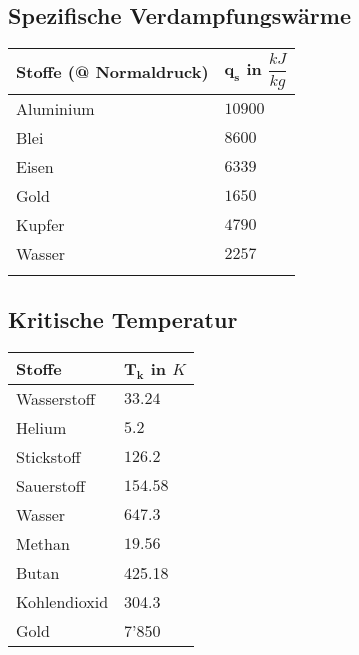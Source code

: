 	\subsection{Spezifische Verdampfungswärme}
		\begin{tabular}{| p{6cm} | p{5cm} |}
			\hline
			\textbf{Stoffe (@ Normaldruck)}	&	$\boldsymbol{q_s}$ in $\dfrac{kJ}{kg}$\\
			\hline
			Aluminium & $10900$\\
			Blei & $8600$\\
			Eisen & $6339$\\
			Gold & $1650$\\
			Kupfer & $4790$\\
			Wasser & $2257$\\
			& \\
			\hline
		\end{tabular}
	
	\subsection{Kritische Temperatur}
		\begin{tabular}{| p{6cm} | p{5cm} |}
			\hline
			\textbf{Stoffe}	&	$\boldsymbol{T_k}$ in $K$\\
			\hline
			Wasserstoff & $33.24$\\
			Helium & $5.2$\\
			Stickstoff & $126.2$\\
			Sauerstoff & $154.58$\\
			Wasser & $647.3$\\
			Methan & $19.56$\\
			Butan & 425.18\\
			Kohlendioxid & 304.3\\
			Gold & 7'850\\
			\hline
		\end{tabular}